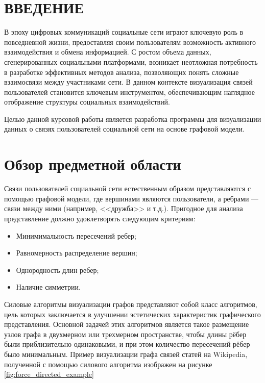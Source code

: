 \documentclass[14pt, russian]{scrartcl}
\newcommand{\anonsection}[1]{\cleardoublepage
\phantomsection
\addcontentsline{toc}{section}{\protect\numberline{}#1}
\section*{#1}\vspace*{2.5ex} %
}
\begin{document}

\setlength{\tabcolsep}{3pt}
\newpage
\setcounter{page}{2}

\newpage
\renewcommand\contentsname{\hfill{\normalfont{СОДЕРЖАНИЕ}}\hfill}  %
\tableofcontents
\newpage
\anonsection{ВВЕДЕНИЕ}  %

В эпоху цифровых коммуникаций социальные сети играют ключевую роль в повседневной жизни, предоставляя своим пользователям возможность активного взаимодействия и обмена информацией.
С ростом объема данных, сгенерированных социальными платформами, возникает неотложная потребность в разработке эффективных методов анализа, позволяющих понять сложные взаимосвязи между участниками сети. В данном контексте визуализация связей пользователей становится ключевым инструментом, обеспечивающим наглядное отображение структуры социальных взаимодействий.

Целью данной курсовой работы является разработка программы для
визуализации данных о связях пользователей социальной сети на основе графовой модели.

\section{Обзор предметной области}

Связи пользователей социальной сети естественным образом представляются с помощью графовой модели,
где вершинами являются пользователи, а ребрами --- связи между ними (например, <<дружба>> и т.д.).
Пригодное для анализа представление должно удовлетворять следующим критериям:

\begin{itemize}
	\item Минимимальность пересечений ребер;
	\item Равномерность распределение вершин;
	\item Однородность длин ребер;
	\item Наличие симметрии.
\end{itemize}

Силовые алгоритмы визуализации графов представляют собой класс алгоритмов, цель которых заключается в улучшении эстетических характеристик графического представления.
Основной задачей этих алгоритмов является такое размещение узлов графа в двухмерном или трехмерном пространстве, чтобы длины рёбер были приблизительно одинаковыми,
и при этом количество пересечений рёбер было минимальным.
Пример визуализации графа связей статей на Wikipedia, полученной с помощью силового алгоритма изображен на рисунке \ref{fig:force_directed_example}
\end{document}
